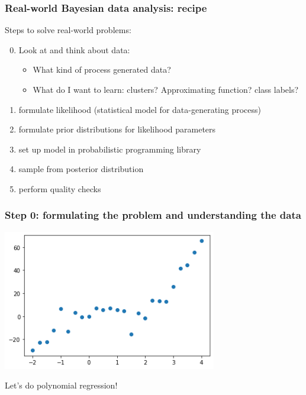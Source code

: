 \documentclass[t,aspectratio=169]{beamer}
\begin{document}
\begin{frame}
  \frametitle{Real-world Bayesian data analysis: recipe}
  Steps to solve real-world problems:
  \begin{enumerate}
    \setcounter{enumi}{-1}
    \item Look at and think about data:
      \begin{itemize}
      \item What kind of process generated data?
      \item What do I want to learn: clusters? Approximating function? class labels?
      \end{itemize}
    \item formulate likelihood (statistical model for data-generating process)
    \item formulate prior distributions for likelihood parameters
    \item set up model in probabilistic programming library
    \item sample from posterior distribution
    \item perform quality checks
  \end{enumerate}
\end{frame}


\begin{frame}
  \frametitle{Step 0: formulating the problem and understanding the data}
  \begin{center}
    \includegraphics[width=0.7\textwidth]{images/polyfit_data.png}
  \end{center}
  \pause
  Let's do polynomial regression!
\end{frame}
\end{document}
